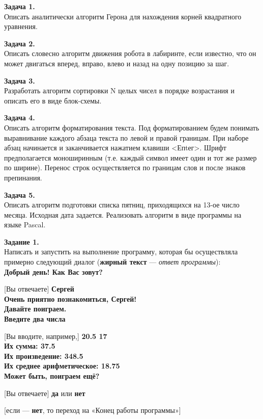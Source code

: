 {\bf Задача 1.}\\ 
Описать аналитически алгоритм Герона для нахождения корней квадратного уравнения.

{\bf Задача 2.}\\ 
Описать словесно алгоритм движения робота в лабиринте, если известно, что он может двигаться вперед, вправо, влево и назад на одну позицию за шаг.

{\bf Задача 3.}\\ 
Разработать алгоритм сортировки N целых чисел в порядке воз­растания и описать его в виде блок-схемы.

{\bf Задача 4.}\\ 
Описать алгоритм форматирования текста. Под форматированием будем понимать выравнивание каждого абзаца текста по левой и правой границам. При наборе абзац начинается и заканчивается нажатием клавиши <Епtег>. Шрифт предполагается моноширинным (т.е. каждый символ имеет один и тот же размер по ширине). Перенос строк осуществляется по границам слов и после знаков препинания.

{\bf Задача 5.}\\ 
Описать алгоритм подготовки списка пятниц, приходящихся на 13-ое число месяца. Исходная дата задается. Реализовать алго­ритм в виде программы на языке Pascal.

{\bf Задание 1.}\\Написать и запустить на выполнение программу, которая бы осуществляла примерно следующий диалог ({\bf жирный текст} --- {\it ответ программы}):\\
{\bf Добрый день!  Как Вас зовут?}

  [Вы отвечаете] {\bf Сергей}\\
 {\bf Очень приятно познакомиться, Сергей! \\Давайте поиграем.}\\
 {\bf Введите два числа}
 
 [Вы вводите, например,]   {\bf 20.5 17}\\
 {\bf Их сумма: 37.5}\\
 {\bf Их произведение: 348.5}\\
 {\bf Их среднее арифметическое: 18.75}\\
 {\bf Может быть, поиграем ещё?}
 
[Вы отвечаете]  {\bf да}  или {\bf нет}

[если ---  {\bf нет},  то  переход на «Конец работы программы»]

